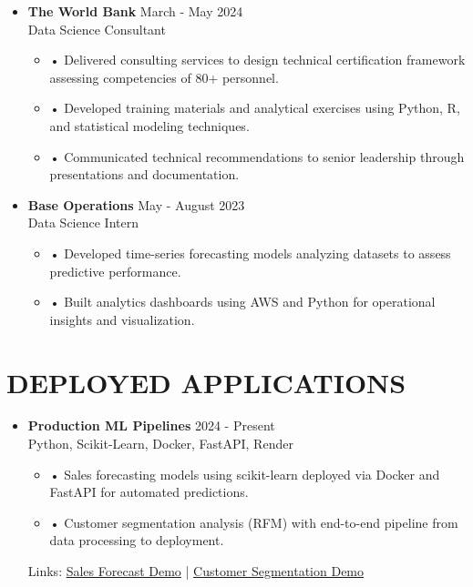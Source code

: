 \documentclass[a4paper,9pt]{extarticle}
\begin{document}
\noindent
\begin{itemize}[leftmargin=0.4cm, label={}]
    \item \textbf{The World Bank} \hfill March - May 2024 \\
    Data Science Consultant
    \vspace{-0.1cm}
    \begin{itemize}[leftmargin=0.3cm, label={}]
    \item \small{•} \normalsize{Delivered consulting services to design technical certification framework assessing competencies of 80+ personnel.}
    \item \small{•} \normalsize{Developed training materials and analytical exercises using Python, R, and statistical modeling techniques.}
    \item \small{•} \normalsize{Communicated technical recommendations to senior leadership through presentations and documentation.}
    \end{itemize}
\end{itemize}

\noindent
\begin{itemize}[leftmargin=0.4cm, label={}]
    \item \textbf{Base Operations} \hfill May - August 2023 \\
    Data Science Intern
    \vspace{-0.1cm}
    \begin{itemize}[leftmargin=0.3cm, label={}]
\item \small{•} \normalsize{Developed time-series forecasting models analyzing datasets to assess predictive performance.}
    \item \small{•} \normalsize{Built analytics dashboards using AWS and Python for operational insights and visualization.}
    \end{itemize}
\end{itemize}

\section*{DEPLOYED APPLICATIONS}

\begin{itemize}[leftmargin=0.4cm, label={}]
    \item \textbf{Production ML Pipelines} \hfill 2024 - Present \\
    Python, Scikit-Learn, Docker, FastAPI, Render
    \begin{itemize}[leftmargin=0.3cm, label={}]
    \item \small{•} \normalsize{Sales forecasting models using scikit-learn deployed via Docker and FastAPI for automated predictions.} 
    \item \small{•} \normalsize{Customer segmentation analysis (RFM) with end-to-end pipeline from data processing to deployment.}
    \end{itemize}
    Links: \href{https://twallett.com/sales-forecast}{Sales Forecast Demo} | \href{https://twallett.com/customer-segmentation}{Customer Segmentation Demo} 
\end{itemize}
\end{document}
